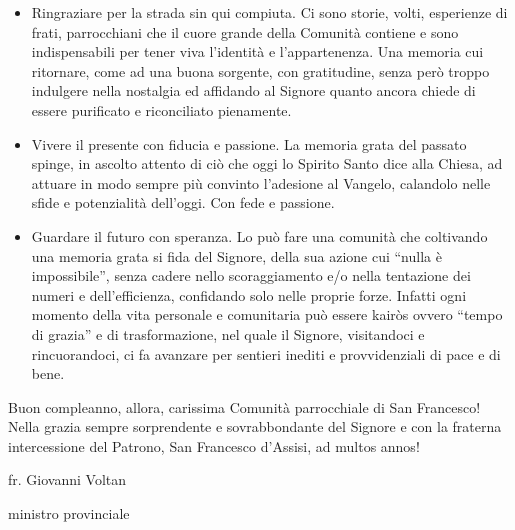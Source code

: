 \begin{itemize}
\item Ringraziare per la strada sin qui compiuta. Ci sono storie, volti, esperienze di frati, 
parrocchiani che il cuore grande della Comunità contiene e sono indispensabili per tener viva 
l’identità e l’appartenenza. Una memoria cui ritornare, come ad una buona sorgente, con 
gratitudine, senza però troppo indulgere nella nostalgia ed affidando al Signore quanto ancora 
chiede di essere purificato e riconciliato pienamente.
\item Vivere il presente con fiducia e passione. La memoria grata del passato spinge, in ascolto 
attento di ciò che oggi lo Spirito Santo dice alla Chiesa, ad attuare in modo sempre più convinto 
l’adesione al Vangelo, calandolo nelle sfide e potenzialità dell’oggi. Con fede e passione.
\item Guardare il futuro con speranza. Lo può fare una comunità che coltivando una memoria 
grata si fida del Signore, della sua azione cui “nulla è impossibile”, senza cadere nello 
scoraggiamento e/o nella tentazione dei numeri e dell’efficienza, confidando solo nelle proprie 
forze. Infatti ogni momento della vita personale e comunitaria può essere kairòs ovvero “tempo di 
grazia” e di trasformazione, nel quale il Signore, visitandoci e rincuorandoci, ci fa avanzare per 
sentieri inediti e provvidenziali di pace e di bene.
\end{itemize}
\bigbreak
\noindent Buon compleanno, allora, carissima Comunità parrocchiale di San Francesco! Nella grazia sempre 
sorprendente e sovrabbondante del Signore e con la fraterna intercessione del Patrono, San 
Francesco d’Assisi,  ad multos annos!
\begin{flushright}
fr. Giovanni Voltan\par
ministro provinciale
\end{flushright}
